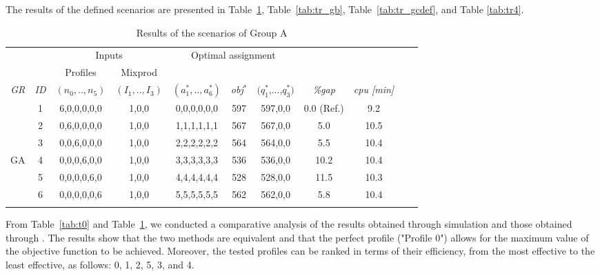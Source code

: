 \documentclass[review,12pt, 3p, times]{elsarticle}
\begin{document}
The results of the defined scenarios are presented in Table~\ref{tab:tr_ga}, Table~\ref{tab:tr_gb}, Table~\ref{tab:tr_gcdef}, and Table \ref{tab:tr4}. 	
								
\setlength{\tabcolsep}{3pt}
\setcounter{table}{2}
\begin{longtable}{|c|c|c|c|c|c|c|c|c|r|r|}
    \hline
    & & \multicolumn{2}{c|}{Inputs} & \multicolumn{3}{c|}{Optimal assignment} & &  \\
    & \multicolumn{1}{c|}{ } & \multicolumn{1}{c|}{Profiles} & \multicolumn{1}{c|}{Mixprod}& \multicolumn{1}{c}{}  & \multicolumn{2}{c|}{} &\multicolumn{1}{c|}{}&\\
    \it{GR} & \it{ID} & \multicolumn{1}{c|}{$(n_0,..,n_5)$} & \multicolumn{1}{c|}{$(I_1,..,I_3)$} & {$(a^*_1,..,a^*_6)$} & \it{obj}$^*$ & $(q^*_1$,...,$q^*_3)$  & \it{\%gap} & \it{ cpu [min]}  \\
    \hline
	        & 1       & 6,0,0,0,0,0                         & 1,0,0                               & 0,0,0,0,0,0          & 597          & 597,0,0                                    & 0.0 (Ref.)     & 9.2     \\
	        & 2       & 0,6,0,0,0,0                         & 1,0,0                               & 1,1,1,1,1,1          & 567          & 567,0,0                                    & 5.0    & 10.5     \\
	        & 3       & 0,0,6,0,0,0                         & 1,0,0                               & 2,2,2,2,2,2          & 564          & 564,0,0                                    & 5.5    & 10.4  \\
	{GA}%
	        & 4       & 0,0,0,6,0,0                         & 1,0,0                               & 3,3,3,3,3,3          & 536          & 536,0,0                                    & 10.2    & 10.4 \\
	        & 5       & 0,0,0,0,6,0                         & 1,0,0                               & 4,4,4,4,4,4          & 528          & 528,0,0                                    & 11.5     & 10.3\\
	        & 6       & 0,0,0,0,0,6                         & 1,0,0                               & 5,5,5,5,5,5          & 562          & 562,0,0                                    & 5.8     & 10.4  \\
	\hline
	\caption{Results of the scenarios of Group A}
	\label{tab:tr_ga}
\end{longtable}


From Table~\ref{tab:t0} and Table~\ref{tab:tr_ga}, we conducted a comparative analysis of the results obtained through simulation and those obtained through . The results show that the two methods are equivalent and that the perfect profile ("Profile 0") allows for the maximum value of the objective function to be achieved. Moreover, the tested profiles can be ranked in terms of their efficiency, from the most effective to the least effective, as follows: 0, 1, 2, 5, 3, and 4. 
\end{document}
